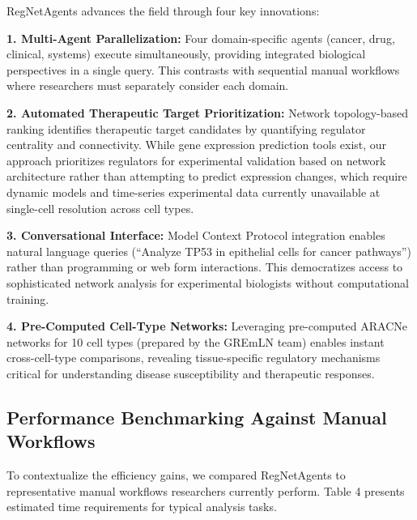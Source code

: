 \documentclass[11pt]{article}
\begin{document}
RegNetAgents advances the field through four key innovations:

\textbf{1. Multi-Agent Parallelization:} Four domain-specific agents (cancer, drug, clinical, systems) execute simultaneously, providing integrated biological perspectives in a single query. This contrasts with sequential manual workflows where researchers must separately consider each domain.

\textbf{2. Automated Therapeutic Target Prioritization:} Network topology-based ranking identifies therapeutic target candidates by quantifying regulator centrality and connectivity. While gene expression prediction tools exist, our approach prioritizes regulators for experimental validation based on network architecture rather than attempting to predict expression changes, which require dynamic models and time-series experimental data currently unavailable at single-cell resolution across cell types.

\textbf{3. Conversational Interface:} Model Context Protocol integration enables natural language queries (``Analyze TP53 in epithelial cells for cancer pathways'') rather than programming or web form interactions. This democratizes access to sophisticated network analysis for experimental biologists without computational training.

\textbf{4. Pre-Computed Cell-Type Networks:} Leveraging pre-computed ARACNe networks for 10 cell types (prepared by the GREmLN team) enables instant cross-cell-type comparisons, revealing tissue-specific regulatory mechanisms critical for understanding disease susceptibility and therapeutic responses.

\subsection{Performance Benchmarking Against Manual Workflows}

To contextualize the efficiency gains, we compared RegNetAgents to representative manual workflows researchers currently perform. Table 4 presents estimated time requirements for typical analysis tasks.
\end{document}
